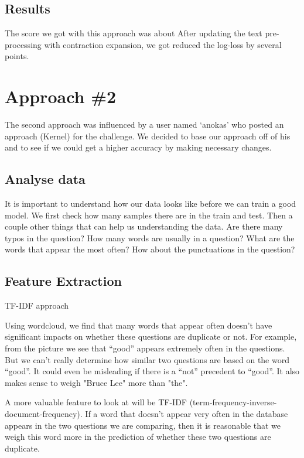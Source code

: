 \documentclass{article}
\begin{document}
\subsection{Results}

The score we got with this approach was about %
After updating the text pre-processing with contraction expansion,
we got reduced the log-loss by several points.

\section{Approach \#2}
The second approach was influenced by a user named ‘anokas’ who posted an approach (Kernel) for the challenge. We decided to base our approach off of his and to see if we could get a higher accuracy by making necessary changes.

\subsection{Analyse data}

It is important to understand how our data looks like before we can train a good model. We first check how many samples there are in the train and test. Then a couple other things that can help us understanding the data. Are there many typos in the question? How many words are usually in a question? What are the words that appear the most often? How about the punctuations in the question?

\subsection{Feature Extraction}

TF-IDF approach

Using wordcloud, we find that many words that appear often doesn’t have significant impacts on whether these questions are duplicate or not. For example, from the picture we see that “good” appears extremely often in the questions. But we can’t really determine how similar two questions are based on the word “good”. It could even be misleading if there is a “not” precedent to “good”. It also makes sense to weigh "Bruce Lee" more than "the".

A more valuable feature to look at will be TF-IDF (term-frequency-inverse-document-frequency). If a word that doesn’t appear very often in the database appears in the two questions we are comparing, then it is reasonable that we weigh this word more in the prediction of whether these two questions are duplicate. 
\end{document}
